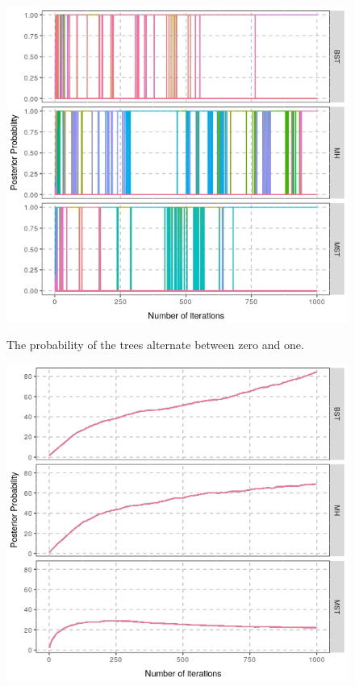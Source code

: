 \documentclass[a1paper,portrait, fontscale=0.45]{baposter}
\begin{document}
\begin{poster}
{\begin{multicols}{3}
\begin{figure}[H]
\begin{minipage}[c]{0.6\linewidth}
\includegraphics[width=\linewidth]{comp3postmix.jpeg}
\label{fig:comppost}
\vspace{-1.7em}
\caption{The probability of the trees alternate between zero and one.}
\end{minipage}
\end{figure}
\begin{figure}[H]
\hspace{1em}
\begin{minipage}[c]{0.6\linewidth}
\includegraphics[width=\linewidth]{comp3treesize.jpeg}

\end{minipage}
\end{figure}
\end{multicols}}
\end{poster}
\end{document}
